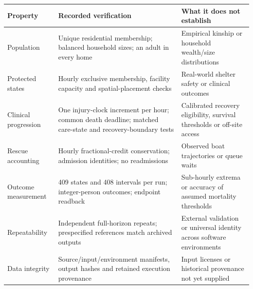\begin{tabular}{@{}p{.24\linewidth}p{.32\linewidth}p{.36\linewidth}@{}}
\toprule
Property & Recorded verification & What it does not establish \\
\midrule
Population & Unique residential membership; balanced household sizes; an adult in every home & Empirical kinship or household wealth/size distributions \\
Protected states & Hourly exclusive membership, facility capacity and spatial-placement checks & Real-world shelter safety or clinical outcomes \\
Clinical progression & One injury-clock increment per hour; common death deadline; matched care-state and recovery-boundary tests & Calibrated recovery eligibility, survival thresholds or off-site access \\
Rescue accounting & Hourly fractional-credit conservation; admission identities; no readmissions & Observed boat trajectories or queue waits \\
Outcome measurement & 409 states and 408 intervals per run; integer-person outcomes; endpoint readback & Sub-hourly extrema or accuracy of assumed mortality thresholds \\
Repeatability & Independent full-horizon repeats; prespecified references match archived outputs & External validation or universal identity across software environments \\
Data integrity & Source/input/environment manifests, output hashes and retained execution provenance & Input licenses or historical provenance not yet supplied \\
\bottomrule
\end{tabular}
